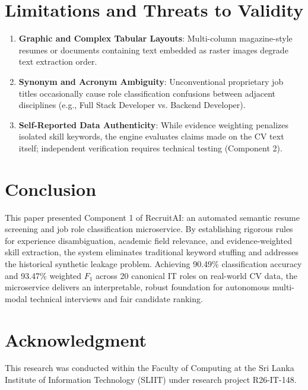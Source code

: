 \documentclass[conference]{IEEEtran}
\begin{document}
\section{Limitations and Threats to Validity}
\begin{enumerate}
    \item \textbf{Graphic and Complex Tabular Layouts}: Multi-column magazine-style resumes or documents containing text embedded as raster images degrade text extraction order.
    \item \textbf{Synonym and Acronym Ambiguity}: Unconventional proprietary job titles occasionally cause role classification confusions between adjacent disciplines (e.g., Full Stack Developer vs. Backend Developer).
    \item \textbf{Self-Reported Data Authenticity}: While evidence weighting penalizes isolated skill keywords, the engine evaluates claims made on the CV text itself; independent verification requires technical testing (Component 2).
\end{enumerate}

\section{Conclusion}
This paper presented Component 1 of RecruitAI: an automated semantic resume screening and job role classification microservice. By establishing rigorous rules for experience disambiguation, academic field relevance, and evidence-weighted skill extraction, the system eliminates traditional keyword stuffing and addresses the historical synthetic leakage problem. Achieving 90.49\% classification accuracy and 93.47\% weighted $F_1$ across 20 canonical IT roles on real-world CV data, the microservice delivers an interpretable, robust foundation for autonomous multi-modal technical interviews and fair candidate ranking.

\section*{Acknowledgment}
This research was conducted within the Faculty of Computing at the Sri Lanka Institute of Information Technology (SLIIT) under research project R26-IT-148.



\end{document}
